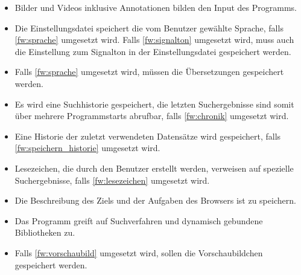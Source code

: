 \begin{itemize}
	\item Bilder und Videos inklusive Annotationen bilden den Input des Programms.
	\item Die Einstellungsdatei speichert die vom Benutzer gewählte Sprache, falls \ref{fw:sprache} umgesetzt wird. Falls \ref{fw:signalton} umgesetzt wird, muss auch die Einstellung zum Signalton in der Einstellungsdatei gespeichert werden.
	\item Falls \ref{fw:sprache} umgesetzt wird, müssen die Übersetzungen gespeichert werden.
	\item Es wird eine Suchhistorie gespeichert, die letzten Suchergebnisse sind somit über mehrere Programmstarts abrufbar, falls \ref{fw:chronik} umgesetzt wird. 
	\item Eine Historie der zuletzt verwendeten Datensätze wird gespeichert, falls \ref{fw:speichern_historie} umgesetzt wird.
	\item Lesezeichen, die durch den Benutzer erstellt werden, verweisen auf spezielle Suchergebnisse, falls \ref{fw:lesezeichen} umgesetzt wird.
	\item Die Beschreibung des Ziels und der Aufgaben des Browsers ist zu speichern.
	\item Das Programm greift auf Suchverfahren und dynamisch gebundene Bibliotheken zu.
	\item Falls \ref{fw:vorschaubild} umgesetzt wird, sollen die Vorschaubildchen gespeichert werden.
\end{itemize}
\pagebreak
